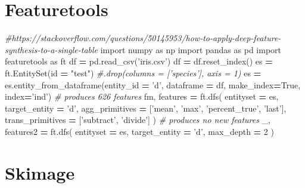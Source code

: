 \documentclass[]{book}
\newenvironment{Shaded}{\begin{snugshade}}{\end{snugshade}}
\newcommand{\DecValTok}[1]{\textcolor[rgb]{0.00,0.00,0.81}{#1}}
\newcommand{\StringTok}[1]{\textcolor[rgb]{0.31,0.60,0.02}{#1}}
\newcommand{\ImportTok}[1]{#1}
\newcommand{\CommentTok}[1]{\textcolor[rgb]{0.56,0.35,0.01}{\textit{#1}}}
\newcommand{\VariableTok}[1]{\textcolor[rgb]{0.00,0.00,0.00}{#1}}
\newcommand{\OperatorTok}[1]{\textcolor[rgb]{0.81,0.36,0.00}{\textbf{#1}}}
\newcommand{\BuiltInTok}[1]{#1}
\newcommand{\NormalTok}[1]{#1}
\begin{document}
\section{Featuretools}\label{featuretools}

\begin{Shaded}
\begin{Highlighting}[]
\CommentTok{#https://stackoverflow.com/questions/50145953/how-to-apply-deep-feature-synthesis-to-a-single-table}
\ImportTok{import}\NormalTok{ numpy }\ImportTok{as}\NormalTok{ np}
\ImportTok{import}\NormalTok{ pandas }\ImportTok{as}\NormalTok{ pd}
\ImportTok{import}\NormalTok{ featuretools }\ImportTok{as}\NormalTok{ ft}
\NormalTok{df }\OperatorTok{=}\NormalTok{ pd.read_csv(}\StringTok{'iris.csv'}\NormalTok{)}
\NormalTok{df }\OperatorTok{=}\NormalTok{ df.reset_index()}
\NormalTok{es }\OperatorTok{=}\NormalTok{ ft.EntitySet(}\BuiltInTok{id} \OperatorTok{=} \StringTok{"test"}\NormalTok{) }\CommentTok{#.drop(columns = ['species'], axis = 1)}
\NormalTok{es }\OperatorTok{=}\NormalTok{ es.entity_from_dataframe(entity_id }\OperatorTok{=} \StringTok{'d'}\NormalTok{, dataframe }\OperatorTok{=}\NormalTok{ df, make_index}\OperatorTok{=}\VariableTok{True}\NormalTok{, index}\OperatorTok{=}\StringTok{'ind'}\NormalTok{)}
\CommentTok{# produces 626 features}
\NormalTok{fm, features }\OperatorTok{=}\NormalTok{ ft.dfs(}
\NormalTok{    entityset }\OperatorTok{=}\NormalTok{ es, }
\NormalTok{    target_entity }\OperatorTok{=} \StringTok{'d'}\NormalTok{,}
\NormalTok{    agg_primitives }\OperatorTok{=}\NormalTok{ [}\StringTok{'mean'}\NormalTok{, }\StringTok{'max'}\NormalTok{, }\StringTok{'percent_true'}\NormalTok{, }\StringTok{'last'}\NormalTok{],}
\NormalTok{    trans_primitives }\OperatorTok{=}\NormalTok{ [}\StringTok{'subtract'}\NormalTok{, }\StringTok{'divide'}\NormalTok{]}
\NormalTok{)}
\CommentTok{# produces no new features}
\NormalTok{_, features2 }\OperatorTok{=}\NormalTok{ ft.dfs(}
\NormalTok{    entityset }\OperatorTok{=}\NormalTok{ es, }
\NormalTok{    target_entity }\OperatorTok{=} \StringTok{'d'}\NormalTok{,}
\NormalTok{    max_depth }\OperatorTok{=} \DecValTok{2}
\NormalTok{)}
\end{Highlighting}
\end{Shaded}

\section{Skimage}\label{skimage}
\end{document}
